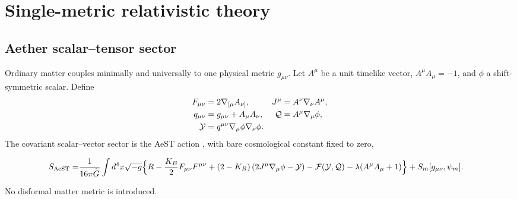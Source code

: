 \section{Single-metric relativistic theory}\label{sec:theory}
\subsection{Aether scalar--tensor sector}
Ordinary matter couples minimally and universally to one physical metric $g_{\mu\nu}$. Let $A^\mu$ be a unit timelike vector, $A^\mu A_\mu=-1$, and $\phi$ a shift-symmetric scalar. Define
\begin{align}
F_{\mu\nu}&=2\nabla_{[\mu}A_{\nu]},&
J^\mu&=A^\nu\nabla_\nu A^\mu,\\
q_{\mu\nu}&=g_{\mu\nu}+A_\mu A_\nu,&
\mathcal{Q}&=A^\mu\nabla_\mu\phi,\\
\mathcal{Y}&=q^{\mu\nu}\nabla_\mu\phi\nabla_\nu\phi.
\end{align}
The covariant scalar--vector sector is the AeST action \cite{SkordisZlosnik2021,SkordisZlosnik2022,BatakiSkordisZlosnik2024}, with bare cosmological constant fixed to zero,
\begin{widetext}
\begin{align}
S_{\rm AeST}=&\frac{1}{16\pi\widetilde G}\int d^4x\sqrt{-g}\Big\{R-\frac{K_B}{2}F_{\mu\nu}F^{\mu\nu}
 +(2-K_B)\left(2J^\mu\nabla_\mu\phi-\mathcal{Y}\right)
-\mathcal{F}(\mathcal{Y},\mathcal{Q})-\lambda(A^\mu A_\mu+1)\Big\}
+S_m[g_{\mu\nu},\psi_m].
\label{eq:aest-action}
\end{align}
\end{widetext}
No disformal matter metric is introduced.

